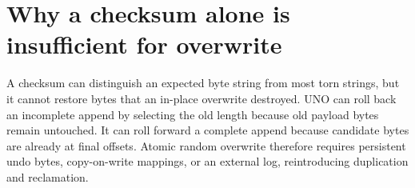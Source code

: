 \documentclass[10pt,twocolumn]{article}
\theoremstyle{remark}
\begin{document}
\section{Why a checksum alone is insufficient for overwrite}

A checksum can distinguish an expected byte string from most torn strings, but it cannot restore
bytes that an in-place overwrite destroyed. UNO can roll back an incomplete append by selecting the
old length because old payload bytes remain untouched. It can roll forward a complete append
because candidate bytes are already at final offsets. Atomic random overwrite therefore requires
persistent undo bytes, copy-on-write mappings, or an external log, reintroducing duplication and
reclamation.
\end{document}
